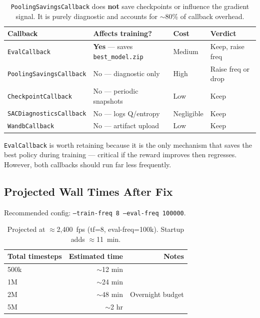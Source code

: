 \documentclass[11pt]{article}
\begin{document}
\begin{table}[h]
\centering
\begin{tabular}{llll}
\toprule
Callback & Affects training? & Cost & Verdict \\
\midrule
\texttt{EvalCallback}          & \textbf{Yes} — saves \texttt{best\_model.zip} & Medium & Keep, raise freq \\
\texttt{PoolingSavingsCallback} & No — diagnostic only                          & High   & Raise freq or drop \\
\texttt{CheckpointCallback}    & No — periodic snapshots                       & Low    & Keep \\
\texttt{SACDiagnosticsCallback} & No — logs Q/entropy                          & Negligible & Keep \\
\texttt{WandbCallback}         & No — artifact upload                          & Low    & Keep \\
\bottomrule
\end{tabular}
\caption{\texttt{PoolingSavingsCallback} does \textbf{not} save checkpoints or
influence the gradient signal. It is purely diagnostic and accounts for
$\sim$80\% of callback overhead.}
\end{table}

\texttt{EvalCallback} is worth retaining because it is the only mechanism
that saves the best policy during training --- critical if the reward
improves then regresses. However, both callbacks should run far less frequently.

\subsection{Projected Wall Times After Fix}

Recommended config: \texttt{--train-freq 8 --eval-freq 100000}.

\begin{table}[h]
\centering
\begin{tabular}{lrr}
\toprule
Total timesteps & Estimated time & Notes \\
\midrule
500k  & $\sim$12 min  & \\
1M    & $\sim$24 min  & \\
2M    & $\sim$48 min  & Overnight budget \\
5M    & $\sim$2 hr    & \\
\bottomrule
\end{tabular}
\caption{Projected at $\approx$2,400~fps (tf=8, eval-freq=100k).
Startup adds $\approx$11~min.}
\end{table}
\end{document}
